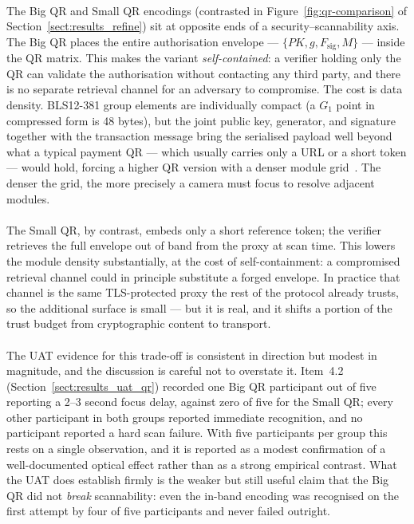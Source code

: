 \paragraph{}The Big QR and Small QR encodings (contrasted in Figure~\ref{fig:qr-comparison} of Section~\ref{sect:results_refine}) sit at opposite ends of a security--scannability axis. The Big QR places the entire authorisation envelope --- $\{PK, g, F_{\text{sig}}, M\}$ --- inside the QR matrix. This makes the variant \textit{self-contained}: a verifier holding only the QR can validate the authorisation without contacting any third party, and there is no separate retrieval channel for an adversary to compromise. The cost is data density. BLS12-381 group elements are individually compact (a $G_1$ point in compressed form is 48 bytes), but the joint public key, generator, and signature together with the transaction message bring the serialised payload well beyond what a typical payment QR --- which usually carries only a URL or a short token --- would hold, forcing a higher QR version with a denser module grid~\cite{worldbank2021ch5, corpuz2025}. The denser the grid, the more precisely a camera must focus to resolve adjacent modules.

\paragraph{}The Small QR, by contrast, embeds only a short reference token; the verifier retrieves the full envelope out of band from the proxy at scan time. This lowers the module density substantially, at the cost of self-containment: a compromised retrieval channel could in principle substitute a forged envelope. In practice that channel is the same TLS-protected proxy the rest of the protocol already trusts, so the additional surface is small --- but it is real, and it shifts a portion of the trust budget from cryptographic content to transport.

\paragraph{}The UAT evidence for this trade-off is consistent in direction but modest in magnitude, and the discussion is careful not to overstate it. Item~4.2 (Section~\ref{sect:results_uat_qr}) recorded one Big QR participant out of five reporting a 2--3 second focus delay, against zero of five for the Small QR; every other participant in both groups reported immediate recognition, and no participant reported a hard scan failure. With five participants per group this rests on a single observation, and it is reported as a modest confirmation of a well-documented optical effect rather than as a strong empirical contrast. What the UAT does establish firmly is the weaker but still useful claim that the Big QR did not \textit{break} scannability: even the in-band encoding was recognised on the first attempt by four of five participants and never failed outright.

